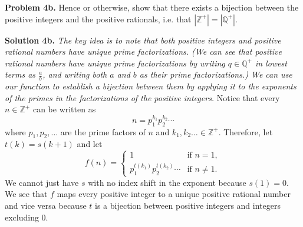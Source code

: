 \documentclass{article}
\begin{document}
\bigskip

\noindent\textbf{Problem 4b.} Hence or otherwise, show that there exists a bijection between the positive integers and the positive rationals, i.e. that $|\mathbb{Z^+}| = |\mathbb{Q^+}|$. 

\bigskip

\noindent\textbf{Solution 4b.} \textit{The key idea is to note that both positive integers and positive rational numbers have unique prime factorizations. (We can see that positive rational numbers have unique prime factorizations by writing $q \in \mathbb{Q^+}$ in lowest terms as $\frac{a}{b}$, and writing both $a$ and $b$ as their prime factorizations.) We can use our function to establish a bijection between them by applying it to the exponents of the primes in the factorizations of the positive integers.} Notice that every $n \in \mathbb{Z^+}$ can be written as
\[
  n = p_1^{k_1}p_2^{k_2} \cdots 
\] 
where $p_1, p_2, \dots$ are the prime factors of $n$ and $k_1, k_2 \dots \in \mathbb{Z^+}$. Therefore, let $t(k) = s(k + 1)$ and let
\[
  f(n) =
  \begin{cases}
    1 & \text{if } n = 1, \\
    p_1^{t(k_1)}p_2^{t(k_2)} \cdots & \text{if } n \neq 1 \text{.}
  \end{cases}
\]
We cannot just have $s$ with no index shift in the exponent because $s(1) = 0$. We see that $f$ maps every positive integer to a unique positive rational number and vice versa because $t$ is a bijection between positive integers and integers excluding 0.
\end{document}
